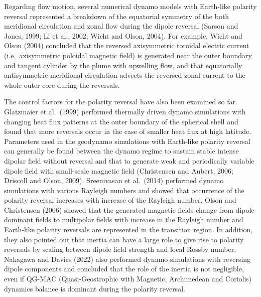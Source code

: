 Regarding flow motion, several numerical dynamo models with Earth-like polarity reversal represented a breakdown of the equatorial symmetry of the both meridional circulation and zonal flow during the dipole reversal 
{\color{teal}
(Sarson and Jones, 1999;
}
Li et al., 2002; %
Wicht and Olson, 2004). %
{\color{teal}
For example,
} Wicht and Olson (2004) concluded that the reversed axisymmetric toroidal electric current (i.e.\ axisymmetric poloidal magnetic field) is generated near the outer boundary and tangent cylinder by the plume with upwelling flow, and that equatorially antisymmetric meridional circulation advects the reversed zonal current to the whole outer core during the reversals.

The control factors for the polarity reversal have also been examined so far.
Glatzmaier et al.\ (1999) %
performed thermally driven dynamo simulations with changing heat flux patterns at the outer boundary of the spherical shell and found that more reversals occur in the case of smaller heat flux at high latitude. 
Parameters used in the geodynamo simulations with Earth-like polarity reversal can generally be found between the dynamo regime to sustain stable intense dipolar field without reversal and that to generate weak and periodically variable dipole field with small-scale magnetic field (Christensen and Aubert, 2006; 
Driscoll and Olson, 2009). %
Sreenivasan et al.\ (2014) %
performed dynamo simulations with various Rayleigh numbers and showed that occurrence of the polarity reversal increases with increase of the Rayleigh number. 
{\color{magenta}
Olson and Christensen (2006) showed that the generated magnetic fields change from dipole-dominant fields to multipolar fields with increase in the Rayleigh number and Earth-like polarity reversals are represented in the transition region.
}
In addition, they also pointed out that inertia can have a large role to give rise to polarity reversals by scaling between dipole field strength and local Rossby number.
Nakagawa and Davies (2022) 
also performed dynamo simulations with reversing dipole components and concluded that the role of the inertia is not negligible, even if QG-MAC (Quasi-Geostrophic with Magnetic, Archimedean and Coriolis) dynamics balance is dominant during the polarity reversal.

